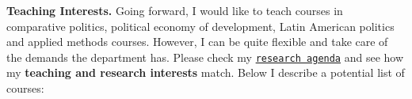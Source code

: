 {\bf Teaching Interests.} Going forward, I would like to teach courses in comparative politics, political economy of development, Latin American politics and applied methods courses. However, I can be quite flexible and take care of the demands the department has. Please check my \href{http://www.hectorbahamonde.com/research/}{\texttt{research agenda}} and see how my {\bf teaching and research interests} match. Below I describe a potential list of courses:
